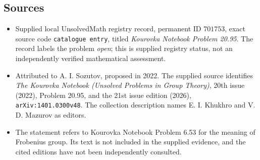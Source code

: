 \documentclass[11pt]{article}
\begin{document}
\subsection{Sources}
\begin{itemize}
\item Supplied local UnsolvedMath registry record, permanent ID \(701753\), exact source code \texttt{catalogue entry}, titled \emph{Kourovka Notebook Problem 20.95}. The record labels the problem \emph{open}; this is supplied registry status, not an independently verified mathematical assessment.
\item Attributed to A. I. Sozutov, proposed in 2022. The supplied source identifies \emph{The Kourovka Notebook (Unsolved Problems in Group Theory)}, 20th issue (2022), Problem 20.95, and the 21st issue edition (2026), \texttt{arXiv:1401.0300v48}. The collection description names E. I. Khukhro and V. D. Mazurov as editors.
\item The statement refers to Kourovka Notebook Problem 6.53 for the meaning of Frobenius group. Its text is not included in the supplied evidence, and the cited editions have not been independently consulted.
\end{itemize}
\end{document}
